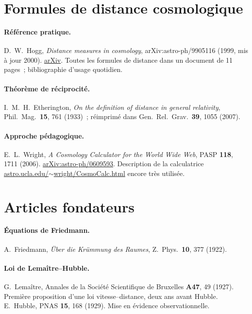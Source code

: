 \documentclass[11pt,a4paper,openany]{report}
\begin{document}
\section{Formules de distance cosmologique}

\paragraph{Référence pratique.}
D.~W.~Hogg, \emph{Distance measures in cosmology}, arXiv:astro-ph/9905116
(1999, mis à jour 2000).
\href{https://arxiv.org/abs/astro-ph/9905116}{arXiv}.
Toutes les formules de distance dans un document de 11 pages~; bibliographie d'usage quotidien.

\paragraph{Théorème de réciprocité.}
I.~M.~H.~Etherington, \emph{On the definition of distance in general relativity},
Phil.\ Mag.\ \textbf{15}, 761 (1933)~; réimprimé dans Gen.\ Rel.\ Grav.\
\textbf{39}, 1055 (2007).

\paragraph{Approche pédagogique.}
E.~L.~Wright, \emph{A Cosmology Calculator for the World Wide Web},
PASP \textbf{118}, 1711 (2006).
\href{https://arxiv.org/abs/astro-ph/0609593}{arXiv:astro-ph/0609593}.
Description de la calculatrice
\href{https://www.astro.ucla.edu/~wright/CosmoCalc.html}
     {astro.ucla.edu/$\sim$wright/CosmoCalc.html} encore très utilisée.

\section{Articles fondateurs}

\paragraph{Équations de Friedmann.}
A.~Friedmann, \emph{Über die Krümmung des Raumes}, Z.\ Phys.\ \textbf{10},
377 (1922).

\paragraph{Loi de Lemaître--Hubble.}
G.~Lemaître, Annales de la Société Scientifique de Bruxelles \textbf{A47}, 49
(1927). Première proposition d'une loi vitesse--distance, deux ans avant Hubble.
\hfill
E.~Hubble, PNAS \textbf{15}, 168 (1929). Mise en évidence observationnelle.
\end{document}
